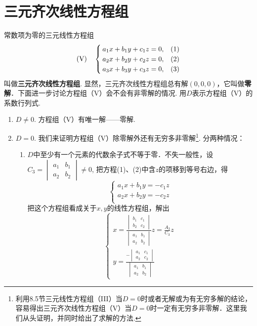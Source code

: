 \section{三元齐次线性方程组}
常数项为零的三元线性方程组
\[({\rm V})\quad \begin{cases}
  a_1x+b_1y+c_1z=0,& (1)\\
  a_2x+b_2y+c_2z=0,& (2)\\
  a_3x+b_3y+c_3z=0,& (3)\\
\end{cases}\]
叫做\textbf{三元齐次线性方程组}. 显然，三元齐次线性方程组总有解$(0,0,0)$，它叫做\textbf{零解}．下面进一步讨论方程组（V）会不会有非零解的情况. 用$D$表示方程组（V）的系数行列式.
\begin{enumerate}
  \item $D\ne 0$. 方程组（V）有唯一解——零解.
  \item $D=0$. 我们来证明方程组（V）除零解外还有无穷多非零解\footnote{利用8.5节三元线性方程组（III）当$D=0$时或者无解或为有无穷多解的结论，容易得出三元齐次线性方程组（V）当$D=0$时一定有无穷多非零解．这里我们从头证明，并同时给出了求解的方法.}. 分两种情况：
\begin{enumerate}[(1)]
  \item $D$中至少有一个元素的代数余子式不等于零．不失一般性，设
$C_3=\begin{vmatrix}
  a_1&b_1\\ a_2&b_2
\end{vmatrix}\ne 0$, 
把方程(1)、(2)中含$z$的项移到等号右边，得
\[\begin{cases}
  a_1x+b_1y=-c_1z\\
  a_2x+b_2y=-c_2z\\
\end{cases}\]
把这个方程组看成关于$x,y$的线性方程组，解出
\[\begin{cases}
  x=\frac{\begin{vmatrix}
  b_1&c_1\\b_2&c_2
  \end{vmatrix}  }{ \begin{vmatrix}
    a_1&b_1\\a_2&b_2 
  \end{vmatrix} }z=\frac{A_3}{C_3}z\\
  y=\frac{-\begin{vmatrix}
    a_1&c_1\\a_2&c_2
    \end{vmatrix}  }{ \begin{vmatrix}
      a_1&b_1\\a_2&b_2 

\end{vmatrix}}
\end{cases}\]
\end{enumerate}
\end{enumerate}
